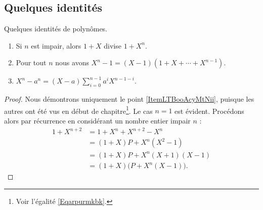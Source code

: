 \subsection{Quelques identités}

\begin{lemma}   \label{LemISPooHIKJBU}
    Quelques identités de polynômes.
    \begin{enumerate}
        \item   \label{ItemLTBooAcyMtN}
            Si \( n\) est impair, alors \( 1+X\) divise \( 1+X^n\).
        \item\label{ItemLTBooAcyMtNii}
            Pour tout \( n\) nous avons \( X^n-1=(X-1)(1+X+\cdots +X^{n-1})\).
        \item
            \( X^n-a^n=(X-a)\sum_{i=0}^{n-1}a^iX^{n-1-i}\).
    \end{enumerate}
\end{lemma}

\begin{proof}
  Nous démontrons uniquement le point \ref{ItemLTBooAcyMtNii}, puisque
  les autres ont été vus en début de chapitre\footnote{Voir l'égalité
    \eqref{Eqarpurmkbk}.}. Le cas \( n=1\) est évident. Procédons
  alors par récurrence en considérant un nombre entier impair \( n\) :
    \begin{subequations}
        \begin{align}
            1+X^{n+2}&=1+X^n+X^{n+2}-X^n\\
                    &=(1+X)P+X^n(X^2-1)\\
                    &=(1+X)P+X^n(X+1)(X-1)\\
                    &=(1+X)\big( P+X^n(X-1) \big).
        \end{align}
    \end{subequations}
\end{proof}
